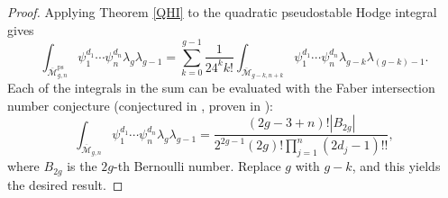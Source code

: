 \documentclass[leqno,12pt]{amsart}
\theoremstyle{remark}
\numberwithin{equation}{section}
\DeclareMathOperator{\ps}{ps}
\begin{document}
\begin{proof}
    Applying Theorem \ref{QHI} to the quadratic pseudostable Hodge integral gives $$\int_{\overline{\mathcal{M}}^{\ps}_{g, n}} \psi_1^{d_1}\cdots \psi_n^{d_n}\lambda_g\lambda_{g-1} = \sum_{k=0}^{g-1}\frac{1}{24^kk!}\int_{\overline{\mathcal{M}}_{g-k, n+k}} \psi_1^{d_1}\cdots\psi_n^{d_n}\lambda_{g-k}\lambda_{(g-k)-1}.$$ Each of the integrals in the sum can be evaluated with the Faber intersection number conjecture (conjectured in \cite{FINC}, proven in \cite{FINCpf}):
    $$
    \int_{\overline{\mathcal{M}}_{g, n}} \psi_1^{d_1}\cdots\psi_n^{d_n}\lambda_{g}\lambda_{g-1} = \frac{(2g - 3 + n)!|B_{2g}|}{2^{2g-1}(2g)!\prod_{j=1}^n(2d_j-1)!!},
    $$
    where $B_{2g}$ is the $2g$-th Bernoulli number. Replace $g$ with $g-k$, and this yields the desired result.
\end{proof}
\appendix


\end{document}

